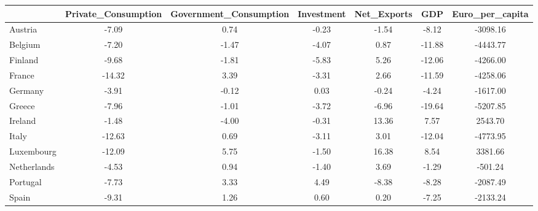 \begin{table}[htbp]
\begin{tabular}{lcccccc} \hline \hline
 & Private_Consumption  & Government_Consumption  & Investment  & Net_Exports  & GDP  & Euro_per_capita  \\  \hline 
Austria &     -7.09 &      0.74 &     -0.23 &     -1.54 &     -8.12 &  -3098.16 \\  
Belgium &     -7.20 &     -1.47 &     -4.07 &      0.87 &    -11.88 &  -4443.77 \\  
Finland &     -9.68 &     -1.81 &     -5.83 &      5.26 &    -12.06 &  -4266.00 \\  
France &    -14.32 &      3.39 &     -3.31 &      2.66 &    -11.59 &  -4258.06 \\  
Germany &     -3.91 &     -0.12 &      0.03 &     -0.24 &     -4.24 &  -1617.00 \\  
Greece &     -7.96 &     -1.01 &     -3.72 &     -6.96 &    -19.64 &  -5207.85 \\  
Ireland &     -1.48 &     -4.00 &     -0.31 &     13.36 &      7.57 &   2543.70 \\  
Italy &    -12.63 &      0.69 &     -3.11 &      3.01 &    -12.04 &  -4773.95 \\  
Luxembourg &    -12.09 &      5.75 &     -1.50 &     16.38 &      8.54 &   3381.66 \\  
Netherlands &     -4.53 &      0.94 &     -1.40 &      3.69 &     -1.29 &   -501.24 \\  
Portugal &     -7.73 &      3.33 &      4.49 &     -8.38 &     -8.28 &  -2087.49 \\  
Spain &     -9.31 &      1.26 &      0.60 &      0.20 &     -7.25 &  -2133.24 \\  
\hline \hline \end{tabular}
\end{table}
